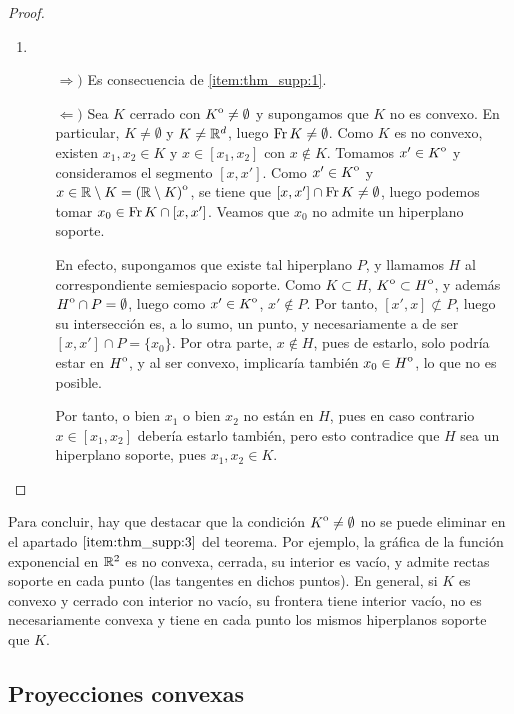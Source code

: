 \begin{proof}
\begin{enumerate}
        \item~
        \begin{enumerate}
            \item[$\Rightarrow)$] Es consecuencia de \ref{item:thm_supp:1}.

            \item[$\Leftarrow)$] Sea $K$ cerrado con ${\kern0ptK}^{\mathrm{o}} \ne \emptyset$ y supongamos que $K$ no es convexo. En particular, $K \ne \emptyset$ y $K \ne \mathbb{R}^d$, luego $\operatorname{Fr} K \ne \emptyset$. Como $K$ es no convexo, existen $x_1,x_2 \in K$ y $x \in [x_1,x_2]$ con $x \notin K$. Tomamos $x' \in {\kern0ptK}^{\mathrm{o}}$ y consideramos el segmento $[x,x']$. Como $x' \in {\kern0ptK}^{\mathrm{o}}$ y $x \in \mathbb{R}\setminus K = {\kern0pt(\mathbb{R}\setminus K)}^{\mathrm{o}}$, se tiene que $[x,x']\cap\operatorname{Fr} K \ne \emptyset$, luego podemos tomar $x_0 \in \operatorname{Fr} K \cap [x,x']$. Veamos que $x_0$ no admite un hiperplano soporte.

            En efecto, supongamos que existe tal hiperplano $P$, y llamamos $H$ al correspondiente semiespacio soporte. Como $K \subset H$, ${\kern0ptK}^{\mathrm{o}} \subset {\kern0ptH}^{\mathrm{o}}$, y además ${\kern0ptH}^{\mathrm{o}} \cap P = \emptyset$, luego como $x' \in {\kern0ptK}^{\mathrm{o}}$, $x' \notin P$. Por tanto, $[x',x]\not\subset P$, luego su intersección es, a lo sumo, un punto, y necesariamente a de ser $[x,x']\cap P = \{x_0\}$. Por otra parte, $x\notin H$, pues de estarlo, solo podría estar en ${\kern0ptH}^{\mathrm{o}}$, y al ser convexo, implicaría también $x_0 \in {\kern0ptH}^{\mathrm{o}}$, lo que no es posible.

            Por tanto, o bien $x_1$ o bien $x_2$ no están en $H$, pues en caso contrario $x \in [x_1,x_2]$ debería estarlo también, pero esto contradice que $H$ sea un hiperplano soporte, pues $x_1,x_2 \in K$.
        \end{enumerate}

    \end{enumerate}
\end{proof}

Para concluir, hay que destacar que la condición ${\kern0ptK}^{\mathrm{o}} \ne \emptyset$ no se puede eliminar en el apartado $\ref{item:thm_supp:3}$ del teorema. Por ejemplo, la gráfica de la función exponencial en $\mathbb{R}^2$ es no convexa, cerrada, su interior es vacío, y admite rectas soporte en cada punto (las tangentes en dichos puntos). En general, si $K$ es convexo y cerrado con interior no vacío, su frontera tiene interior vacío, no es necesariamente convexa y tiene en cada punto los mismos hiperplanos soporte que $K$.

\subsection{Proyecciones convexas}

